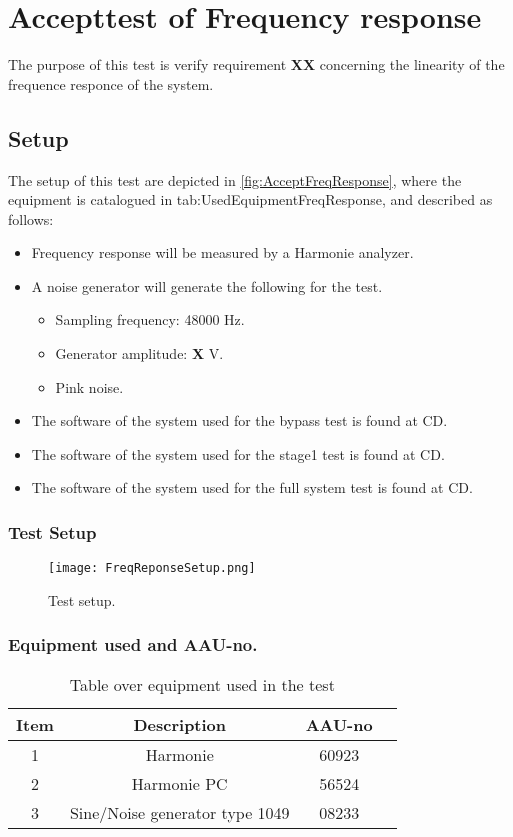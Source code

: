 \chapter{Accepttest of Frequency response}\label{app:journal_Frequency_Response}
The purpose of this test is verify requirement \textbf{XX} concerning the linearity of the frequence responce of the system.

\section{Setup}
The setup of this test are depicted in \autoref{fig:AcceptFreqResponse}, where the equipment is catalogued in tab:UsedEquipmentFreqResponse, and described as follows:

\begin{itemize}
\item Frequency response will be measured by a Harmonie analyzer.
\item A noise generator will generate the following for the test. 
\begin{itemize}
\item Sampling frequency: 48000 Hz.
\item Generator amplitude: \textbf{X} V.
\item Pink noise.
\end{itemize}
\item The software of the system used for the bypass test is found at CD. 
\item The software of the system used for the stage1 test is found at CD. 
\item The software of the system used for the full system test is found at CD. 
\end{itemize}


\subsection*{Test Setup}
\begin{figure}[H]
\centering
\texttt{[image: FreqReponseSetup.png]}
\label{fig:AcceptFreqResponse}
\caption{Test setup.}
\end{figure}

\subsection*{Equipment used and AAU-no.}

\begin{table}[H]
\centering
{}
\begin{tabular}{S[table-format=1]ccc} \toprule
    {Item} & {Description} & {AAU-no} \\       &  Harmonie  & 60923  \\ 
    2      &  Harmonie PC  & 56524  \\ 
    3      &  Sine/Noise generator type 1049  & 08233  \\  \bottomrule 
\end{tabular}
\caption{Table over equipment used in the test}
\label{tab:UsedEquipmentFreqResponse}
\end{table}
\vspace{-5mm}


